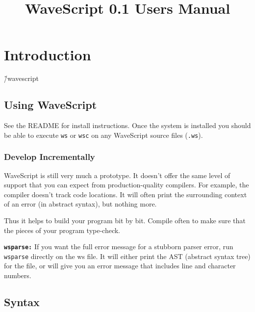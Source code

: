 


\title{WaveScript 0.1 Users Manual}



\maketitle


\tableofcontents
\clearpage

\chapter{Introduction}

\~/wavescript

\section{Using WaveScript}

See the README for install instructions.  Once the system is installed
you should be able to execute {\tt ws} or {\tt wsc} on any WaveScript
source files ({\tt .ws}).

\subsection*{Develop Incrementally}

WaveScript is still very much a prototype.  It doesn't offer the same
level of support that you can expect from production-quality
compilers.  For example, the compiler doesn't track code locations.
It will often print the surrounding context of an error (in abstract
syntax), but nothing more.

Thus it helps to build your program bit by bit.  Compile often to make
sure that the pieces of your program type-check.

{\tt \bf wsparse:}
If you want the full error message for a stubborn parser error, run
{\tt wsparse} directly on the ws file.  It will either print the AST
(abstract syntax tree) for the file, or will give you an error message
that includes line and character numbers.


\section{Syntax}

